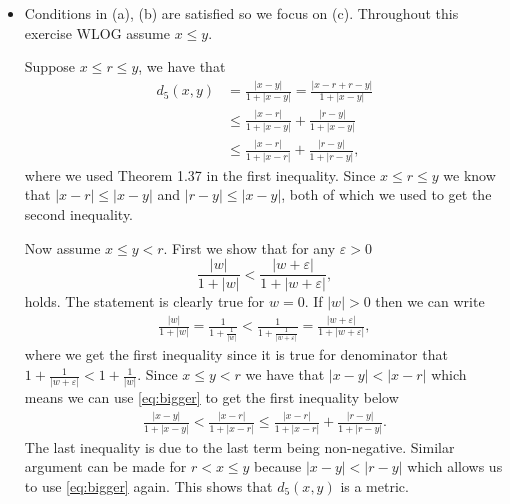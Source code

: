 \documentclass[11pt]{article}
\newcommand{\dist}[3]{d_#1(#2, #3)}
\newcommand{\distfive}[2]{\frac{|#1|}{1 + |#2|}}
\newcommand{\distfivenoabs}[2]{\frac{#1}{1 + #2}}
\begin{document}
\begin{itemize}
\item[$\dist{5}{x}{y}$] Conditions in (a), (b) are satisfied so we
  focus on (c). Throughout this exercise WLOG assume $x \leq y$.

  Suppose $x \leq r \leq y$, we have that
  \begin{align*}
    \dist{5}{x}{y} &= \distfive{x-y}{x-y} = \distfive{x-r+r-y}{x-y} \\
                   &\leq \distfive{x-r}{x-y} + \distfive{r-y}{x-y} \\
                   &\leq \distfive{x-r}{x-r} + \distfive{r-y}{r-y},
  \end{align*}
  where we used Theorem 1.37 in the first inequality. Since
  $x \leq r \leq y$ we know that $|x-r| \leq |x-y|$ and
  $|r-y| \leq |x-y|$, both of which we used to get the second
  inequality.

  Now assume $x \leq y < r$. First we show that for any
  $\varepsilon > 0$
  $$\distfive{w}{w} < \distfive{w+\varepsilon}{w+\varepsilon},$$
  holds. The statement is clearly true for $w=0$. If $|w| > 0$ then we
  can write
  \begin{align} \label{eq:bigger}
    \distfive{w}{w} = \distfivenoabs{1}{\frac{1}{|w|}}
                    < \distfivenoabs{1}{\frac{1}{|w+\varepsilon|}} 
                    = \distfive{w+\varepsilon}{w+\varepsilon},
  \end{align}
  where we get the first inequality since it is true for denominator
  that $ 1+ \frac{1}{|w+\varepsilon|} < 1 + \frac{1}{|w|}$. Since
  $x \leq y < r$ we have that $|x-y| < |x - r|$ which means we can use
  \eqref{eq:bigger} to get the first inequality below
  \begin{align*}
    \distfive{x-y}{x-y} < \distfive{x-r}{x-r} \leq \distfive{x-r}{x-r} + \distfive{r-y}{r-y}.
  \end{align*}
  The last inequality is due to the last term being
  non-negative. Similar argument can be made for $r < x \leq y$
  because $|x-y| < |r-y|$ which allows us to use \eqref{eq:bigger}
  again. This shows that $\dist{5}{x}{y}$ is a metric.


\end{itemize}
\end{document}
